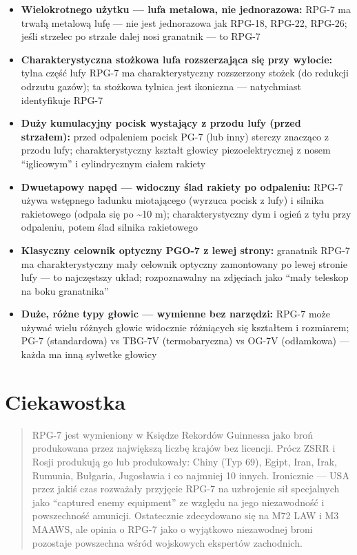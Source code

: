 \documentclass[12pt,openany,oneside]{book}
\providecommand{\tightlist}{%
  \setlength{\itemsep}{0pt}\setlength{\parskip}{0pt}}
\begin{document}
\begin{itemize}
\tightlist
\item
  \textbf{Wielokrotnego użytku --- lufa metalowa, nie jednorazowa:}
  RPG-7 ma trwałą metalową lufę --- nie jest jednorazowa jak RPG-18,
  RPG-22, RPG-26; jeśli strzelec po strzale dalej nosi granatnik --- to
  RPG-7
\item
  \textbf{Charakterystyczna stożkowa lufa rozszerzająca się przy
  wylocie:} tylna część lufy RPG-7 ma charakterystyczny rozszerzony
  stożek (do redukcji odrzutu gazów); ta stożkowa tylnica jest ikoniczna
  --- natychmiast identyfikuje RPG-7
\item
  \textbf{Duży kumulacyjny pocisk wystający z przodu lufy (przed
  strzałem):} przed odpaleniem pocisk PG-7 (lub inny) sterczy znacząco z
  przodu lufy; charakterystyczny kształt głowicy piezoelektrycznej z
  nosem ``iglicowym'' i cylindrycznym ciałem rakiety
\item
  \textbf{Dwuetapowy napęd --- widoczny ślad rakiety po odpaleniu:}
  RPG-7 używa wstępnego ładunku miotającego (wyrzuca pocisk z lufy) i
  silnika rakietowego (odpala się po \textasciitilde10 m);
  charakterystyczny dym i ogień z tyłu przy odpaleniu, potem ślad
  silnika rakietowego
\item
  \textbf{Klasyczny celownik optyczny PGO-7 z lewej strony:} granatnik
  RPG-7 ma charakterystyczny mały celownik optyczny zamontowany po lewej
  stronie lufy --- to najczęstszy układ; rozpoznawalny na zdjęciach jako
  ``mały teleskop na boku granatnika''
\item
  \textbf{Duże, różne typy głowic --- wymienne bez narzędzi:} RPG-7 może
  używać wielu różnych głowic widocznie różniących się kształtem i
  rozmiarem; PG-7 (standardowa) vs TBG-7V (termobaryczna) vs OG-7V
  (odłamkowa) --- każda ma inną sylwetke głowicy
\end{itemize}

\section{Ciekawostka}\label{ciekawostka-68}

\begin{quote}
RPG-7 jest wymieniony w Księdze Rekordów Guinnessa jako broń produkowana
przez największą liczbę krajów bez licencji. Prócz ZSRR i Rosji
produkują go lub produkowały: Chiny (Typ 69), Egipt, Iran, Irak,
Rumunia, Bułgaria, Jugosławia i co najmniej 10 innych. Ironicznie ---
USA przez jakiś czas rozważały przyjęcie RPG-7 na uzbrojenie sił
specjalnych jako ``captured enemy equipment'' ze względu na jego
niezawodność i powszechność amunicji. Ostatecznie zdecydowano się na M72
LAW i M3 MAAWS, ale opinia o RPG-7 jako o wyjątkowo niezawodnej broni
pozostaje powszechna wśród wojskowych ekspertów zachodnich.
\end{quote}
\end{document}
